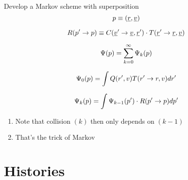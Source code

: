 \documentclass[aspectratio=1610,pdftex,dvipsnames,compress,xcolor={dvipsnames}]{beamer}
\begin{document}
\begin{frame}{Develop a Markov scheme with superposition}
    \begin{equation}
        \Large
        p \equiv (\underline{r},\underline{v})
    \end{equation}

    \begin{equation}
        \Large
        R(p' \rightarrow p) \equiv C(\underline{v}' \rightarrow \underline{v},\underline{r}') \cdot T(\underline{r}' \rightarrow \underline{r},\underline{v})
    \end{equation}

    \begin{equation}
        \Large
        \Psi(p) = \sum_{k=0}^{\infty} \Psi_k(p)
    \end{equation}

    \begin{equation}
        \Large
        \Psi_0(p) = \int Q(r',v) T(r' \rightarrow r,v)dr'
    \end{equation}

    \begin{equation}
        \Large
        \Psi_k(p)=\int \Psi_{k-1}(p') \cdot R(p' \rightarrow p)dp'
    \end{equation}

    \vspace*{\fill}

    \begin{enumerate}[series=outerlist,topsep=0pt,itemsep=11pt,leftmargin=*,label=(\arabic*)]
        \item[]Note that collision $(k)$ then only depends on $(k-1)$
        \item[]That's the trick of Markov
    \end{enumerate}
\end{frame}


\section{Histories}
\end{document}
